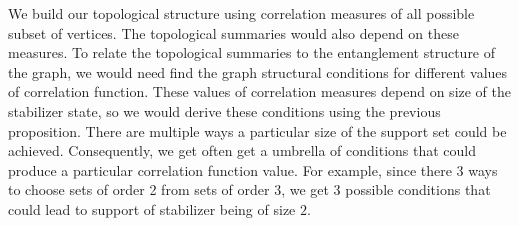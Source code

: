 \documentclass{article}
\begin{document}
We build our topological structure using correlation measures of all possible subset of vertices. The topological summaries would also depend on these measures. To relate the topological summaries to the entanglement structure of the graph, we would need find the graph structural conditions for different values of correlation function. These values of correlation measures depend on size of the stabilizer state, so we would derive these conditions using the previous proposition. There are multiple ways a particular size of the support set could be achieved. Consequently, we get often get a umbrella of conditions that could produce a particular correlation function value. For example, since there 3 ways to choose sets of order 2 from sets of order 3, we get 3 possible conditions that could lead to support of stabilizer being of size $2$.
\end{document}
